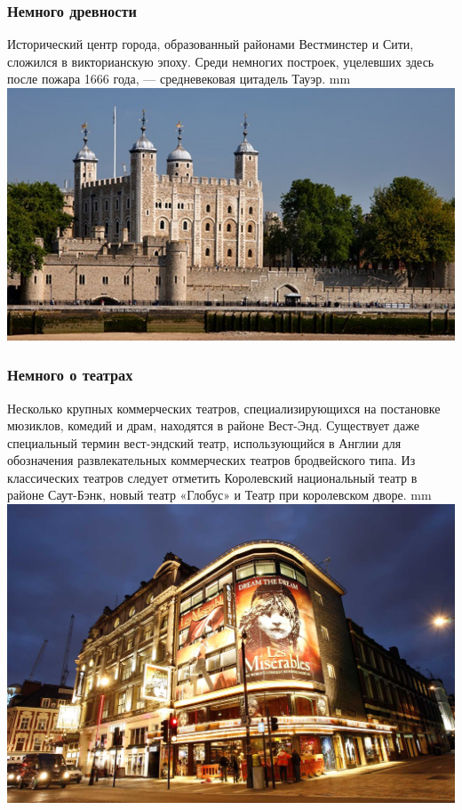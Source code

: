 \documentclass{beamer}
\begin{document}
\begin{frame}
\frametitle{Немного древности}
Исторический центр города, образованный районами Вестминстер и Сити, 
сложился в викторианскую эпоху. 
Среди немногих построек, уцелевших здесь после пожара 1666 года, --- средневековая цитадель Тауэр.
 mm
\centering\includegraphics[width=0.6\linewidth]{london6.jpg}
\end{frame}

\begin{frame}
\frametitle{Немного о театрах}
Несколько крупных коммерческих театров, специализирующихся 
на постановке мюзиклов, 
комедий и драм, находятся в районе Вест-Энд. 
Существует даже специальный термин вест-эндский театр, 
использующийся в Англии для обозначения 
развлекательных коммерческих театров бродвейского типа. Из классических театров следует 
отметить Королевский национальный театр в районе Саут-Бэнк, новый театр «Глобус» и Театр при королевском дворе. 
 mm
\centering\includegraphics[width=0.4\linewidth]{london7.jpg}
\end{frame}
\end{document}

